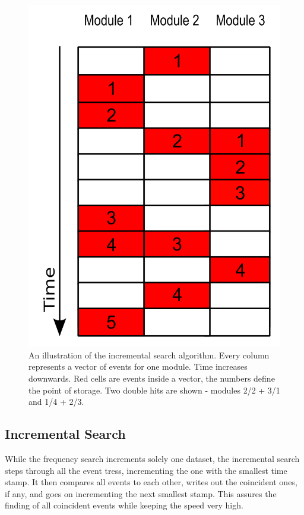 \begin{figure}
\begin{minipage}{0.49\textwidth}
      	\includegraphics[width = \textwidth]{graphics/search/incrementalSearch.png}
      	\caption[Incremental search algorithm]{An illustration of the incremental search algorithm. Every column represents a vector of events for one module. Time increases downwards. Red cells are events inside a vector, the numbers define the point of storage. Two double hits are shown - modules 2/2 + 3/1 and 1/4 + 2/3.}
      	\vspace{2.45 cm}
      	\end{minipage}
      \end{figure} 
      \subsection{Incremental Search}
      \label{ch:Analysis software:sec:Search algorithms:subsec: Incremental Search}
      While the frequency search increments solely one dataset, the incremental search steps through all the event tress, incrementing the one with the smallest time stamp. It then compares all events to each other, writes out the coincident ones, if any, and goes on incrementing the next smallest stamp. This assures the finding of all coincident events while keeping the speed very high.

